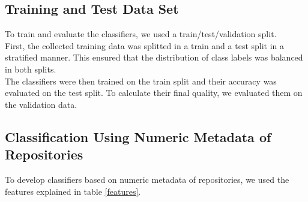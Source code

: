 \documentclass{article}
\begin{document}
\subsection{Training and Test Data
Set}\label{training-and-test-data-set}

To train and evaluate the classifiers, we used a train/test/validation
split.\\
First, the collected training data was splitted in a train and a test
split in a stratified manner. This ensured that the distribution of
class labels was balanced in both splits.\\
The classifiers were then trained on the train split and their accuracy
was evaluated on the test split. To calculate their final quality, we
evaluated them on the validation data.

\subsection{Classification Using Numeric Metadata of
Repositories}\label{classification-using-numeric-metadata-of-repositories}

To develop classifiers based on numeric metadata of repositories, we
used the features explained in table \ref{features}.
\end{document}
